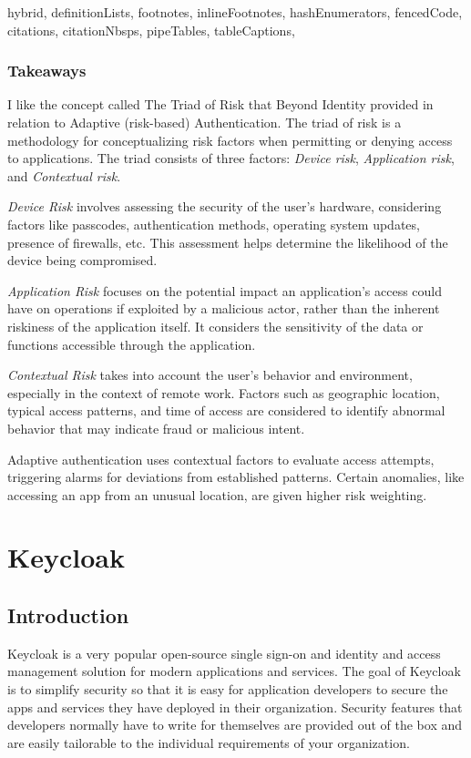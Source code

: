 \documentclass[
  digital,     %
  oneside,     %
  nosansbold,  %
  nocolorbold, %
  lof,         %
  lot,         %
]{fithesis4}
\begin{document}
\begin{markdown*}{%
  hybrid,
  definitionLists,
  footnotes,
  inlineFootnotes,
  hashEnumerators,
  fencedCode,
  citations,
  citationNbsps,
  pipeTables,
  tableCaptions,
}
\subsection{Takeaways}
I like the concept called The Triad of Risk that Beyond Identity provided in relation to Adaptive (risk-based) Authentication.
The triad of risk is a methodology for conceptualizing risk factors when permitting or denying access to applications.
The triad consists of three factors: \textit{Device risk}, \textit{Application risk}, and \textit{Contextual risk}.

\textit{Device Risk} involves assessing the security of the user's hardware, considering factors like passcodes, authentication methods, operating system updates, presence of firewalls, etc.
This assessment helps determine the likelihood of the device being compromised.

\textit{Application Risk} focuses on the potential impact an application's access could have on operations if exploited by a malicious actor, rather than the inherent riskiness of the application itself.
It considers the sensitivity of the data or functions accessible through the application.

\textit{Contextual Risk} takes into account the user's behavior and environment, especially in the context of remote work. Factors such as geographic location, typical access patterns, and time of access are considered to identify abnormal behavior that may indicate fraud or malicious intent.

Adaptive authentication uses contextual factors to evaluate access attempts, triggering alarms for deviations from established patterns. Certain anomalies, like accessing an app from an unusual location, are given higher risk weighting. \cite{existing-beyond-identity}



\newpage

\chapter{Keycloak}

\section{Introduction}
Keycloak is a very popular open-source single sign-on and identity and access management solution for modern applications and services.
The goal of Keycloak is to simplify security so that it is easy for application developers to secure the apps and services they have deployed in their organization.
Security features that developers normally have to write for themselves are provided out of the box and are easily tailorable to the individual requirements of your organization.


\end{markdown*}
\end{document}
